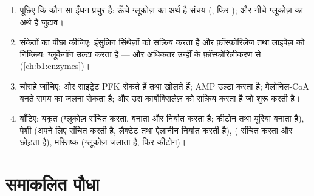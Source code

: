 \begin{method}\label{met:b1:biosyntheses-integration:state}
\begin{enumerate}
  \item पूछिए कि कौन-सा ईंधन प्रचुर है: ऊँचे ग्लूकोज़ का अर्थ है संचय
        (, फिर ); और नीचे ग्लूकोज़ का अर्थ है जुटाव।
  \item संकेतों का पीछा कीजिए: इंसुलिन सिंथेज़ों को सक्रिय करता है और
        फ़ॉस्फ़ोरिलेज़ तथा लाइपेज़ को निष्क्रिय; ग्लूकैगॉन उल्टा करता है
        --- और अधिकतर उन्हीं  के फ़ॉस्फ़ोरिलीकरण से
        (\cref{ch:b1:enzymes})।
  \item चौराहे जाँचिए:  और साइट्रेट PFK रोकते हैं तथा 
        खोलते हैं; AMP उल्टा करता है; मैलोनिल-CoA  बनते समय  का
        जलना रोकता है; और  उस कार्बोक्सिलेज़ को सक्रिय करता
        है जो  शुरू करती है।
  \item {} बाँटिए: यकृत (ग्लूकोज़ संचित करता, बनाता और निर्यात करता है;
        कीटोन तथा यूरिया बनाता है), पेशी (अपने लिए  संचित करती
        है, लैक्टेट तथा ऐलानीन निर्यात करती है),   ( संचित
        करता और छोड़ता है), मस्तिष्क (ग्लूकोज़ जलाता है, फिर कीटोन)।
\end{enumerate}
\end{method}

\section{समाकलित पौधा}

